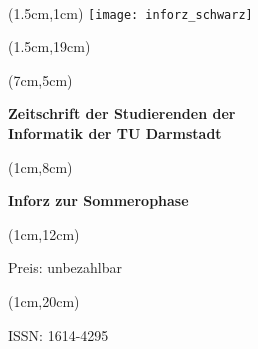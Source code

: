 \begin{titlepage}~


    \begin{textblock*}{12cm}(1.5cm,1cm)
        \texttt{[image: inforz\_schwarz]}
    \end{textblock*}


    \begin{textblock*}{12cm}(1.5cm,19cm)
    \end{textblock*}

    \begin{textblock*}{7cm}(7cm,5cm)
        \begin{flushright}
            \large\sffamily\textbf{
                \textcolor{.}{Zeitschrift der Studierenden der}\\
                \textcolor{.}{Informatik der TU Darmstadt}}
        \end{flushright}
    \end{textblock*}



    \begin{textblock*}{5cm}(1cm,8cm)
        \begin{rotate}{90}
            \sffamily\huge\textbf{
                \textcolor{.}{Inforz zur Sommerophase \the\year}}
        \end{rotate}
    \end{textblock*}


    \begin{textblock*}{2cm}(1cm,12cm)
        \begin{rotate}{90}
            \sffamily\tiny \textcolor{.}{Preis: unbezahlbar}
        \end{rotate}
    \end{textblock*}


    \begin{textblock*}{2cm}(1cm,20cm)
        \begin{rotate}{90}
            \sffamily \textcolor{.}{ISSN: 1614-4295}
        \end{rotate}
    \end{textblock*}
\end{titlepage}
\newpage
